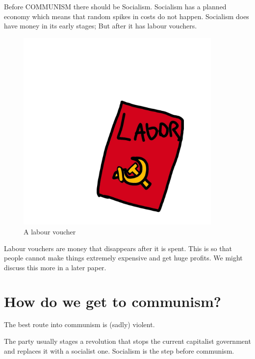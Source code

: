 \documentclass[a4paper]{book}%
\begin{document}
  Before COMMUNISM there should be Socialism. Socialism has a planned economy which means that random spikes in costs do not happen. Socialism does have money in its early stages; But after it has labour vouchers. 

\begin{figure}[tbhp]
\centering
\includegraphics[width=0.9\textwidth]{2-4.png}
\caption{A labour voucher}
\end{figure}

  Labour vouchers are money that disappears after it is spent. This is so that people cannot make things extremely expensive and get huge profits. We might discuss this more in a later paper.

\chapter{How do we get to communism?}

The best route into communism is (sadly) violent.

The party usually stages a revolution that stops the current capitalist government and replaces it with a socialist one. Socialism is the step before communism.
\end{document}
